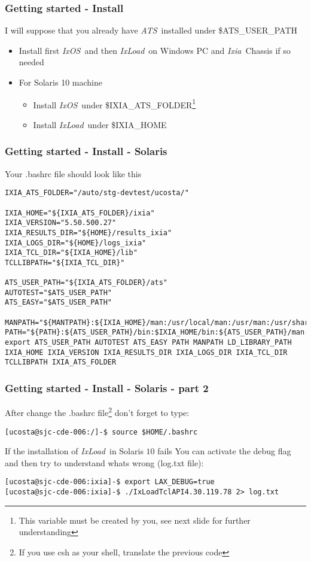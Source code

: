\documentclass{beamer}
\newcommand{\ixload}{\emph{IxLoad}}
\newcommand{\ixos}{\emph{IxOS}}
\newcommand{\ats}{\emph{ATS}}
\newcommand{\ixia}{\emph{Ixia}}
\begin{document}
\begin{frame}[fragile] \frametitle{Getting started - Install}
I will suppose that you already have \ats~installed under {\scriptsize\ttfamily \$ATS\_USER\_PATH}
\begin{itemize}
	\item Install first \ixos~and then \ixload~on Windows PC and \ixia~Chassis if so needed
	\item For Solaris 10 machine
	\begin{itemize}
		\item Install \ixos~under {\scriptsize\ttfamily \$IXIA\_ATS\_FOLDER}\footnote{This variable must be created by you, see next slide for further understanding}
		\item Install \ixload~under {\scriptsize\ttfamily \$IXIA\_HOME}
	\end{itemize}
\end{itemize}
\end{frame}

\begin{frame}[fragile] \frametitle{Getting started - Install - Solaris}
\begin{block}{Your .bashrc file should look like this}
\begin{lstlisting}[language=Terminal]
IXIA_ATS_FOLDER="/auto/stg-devtest/ucosta/"

IXIA_HOME="${IXIA_ATS_FOLDER}/ixia"
IXIA_VERSION="5.50.500.27"
IXIA_RESULTS_DIR="${HOME}/results_ixia"
IXIA_LOGS_DIR="${HOME}/logs_ixia"
IXIA_TCL_DIR="${IXIA_HOME}/lib"
TCLLIBPATH="${IXIA_TCL_DIR}"

ATS_USER_PATH="${IXIA_ATS_FOLDER}/ats"
AUTOTEST="$ATS_USER_PATH"
ATS_EASY="$ATS_USER_PATH"

MANPATH="${MANTPATH}:${IXIA_HOME}/man:/usr/local/man:/usr/man:/usr/share/man:/usr/autotool/devel/man:"
PATH="${PATH}:${ATS_USER_PATH}/bin:$IXIA_HOME/bin:${ATS_USER_PATH}/man:"
export ATS_USER_PATH AUTOTEST ATS_EASY PATH MANPATH LD_LIBRARY_PATH IXIA_HOME IXIA_VERSION IXIA_RESULTS_DIR IXIA_LOGS_DIR IXIA_TCL_DIR TCLLIBPATH IXIA_ATS_FOLDER
\end{lstlisting}
\end{block}
\end{frame}

\begin{frame}[fragile] \frametitle{Getting started - Install - Solaris - part 2}
After change the .bashrc file\footnote{If you use csh as your shell, translate the previous code} don't forget to type:
\begin{lstlisting}[language=Terminal]
[ucosta@sjc-cde-006:/]-$ source $HOME/.bashrc
\end{lstlisting}
\begin{block}{If the installation of \ixload~in Solaris $10$ fails}
You can activate the debug flag and then try to understand whats wrong ({\scriptsize\ttfamily log.txt} file):
\begin{lstlisting}[language=Terminal]
[ucosta@sjc-cde-006:ixia]-$ export LAX_DEBUG=true
[ucosta@sjc-cde-006:ixia]-$ ./IxLoadTclAPI4.30.119.78 2> log.txt
\end{lstlisting}
\end{block}
\end{frame}
\end{document}
